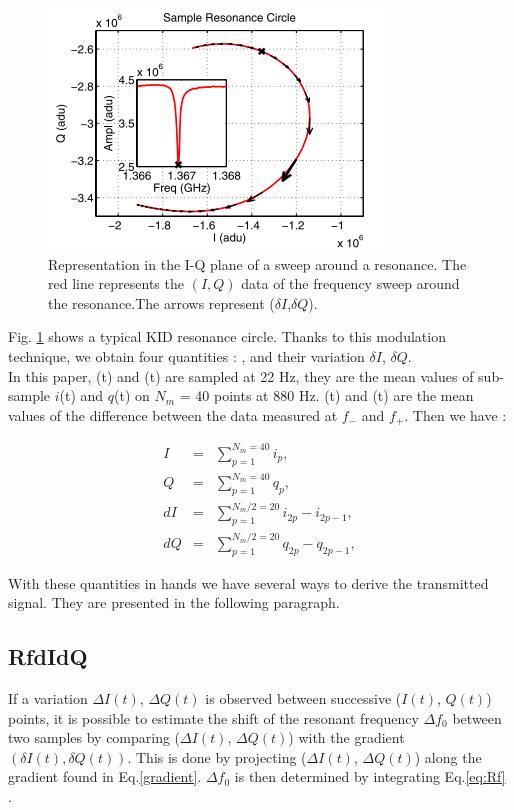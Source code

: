 \begin{figure}[h]
\center
	\includegraphics[scale=0.8]{Figures/resonance-circle.png}
	\caption{Representation in the I-Q plane of a sweep around a resonance. The red line represents the $(I,Q)$ data of the frequency sweep around the resonance.The arrows represent ($\delta I$,$\delta Q$). \citep{2013A&A...551L..12C}}
	\label{circle-iq}
\end{figure}

Fig. \ref{circle-iq} shows a typical KID resonance circle. Thanks to this
modulation technique, we obtain four quantities : \I, \Q and their variation
$\delta I$, $\delta Q$.\\ In this paper, \I(t) and \Q(t) are sampled at 22 Hz,
they are the mean values of sub-sample $i$(t) and $q$(t) on $N_{m}$ = 40 points at
880 Hz. \di(t) and \dq(t) are the mean values of the difference between the data
measured at $f_{-}$ and $f_{+}$. Then we have :

\begin{eqnarray}
I  &=& \sum^{N_{m}=40}_{p=1} i_{p},\\
Q  &=& \sum^{N_{m}=40}_{p=1} q_{p},\\
dI &=& \sum^{N_{m}/2=20}_{p=1} i_{2p} - i_{2p-1},\\
dQ &=& \sum^{N_{m}/2=20}_{p=1} q_{2p} - q_{2p-1},
\end{eqnarray}


With these quantities in hands we have several ways to derive the transmitted signal. They are presented in the following paragraph.

\subsection{RfdIdQ}
If a variation $\Delta I(t)$, $\Delta Q(t)$ is observed between successive  ($I(t)$, $Q(t)$) points, it is possible to estimate the shift of the resonant frequency $\Delta f_{0}$ between two samples by comparing ($\Delta I(t)$, $\Delta Q(t)$) with the gradient $(\delta I(t), \delta Q(t)) $. This is done by projecting ($\Delta I(t)$, $\Delta Q(t)$) along the gradient found in Eq.\ref{gradient}. $\Delta f_{0}$ is then determined by integrating Eq.\ref{eq:Rf} \citep{2014A&A...569A...9C}.

